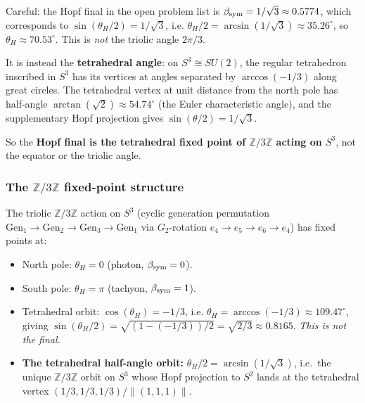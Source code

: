 \begin{remark}
\label{rem:hopf-final-fix}
Careful: the Hopf final in the open problem list is
$\beta_{\mathrm{sym}} = 1/\sqrt{3} \approx 0.5774$, which corresponds to
$\sin(\theta_H/2) = 1/\sqrt{3}$, i.e. $\theta_H/2 = \arcsin(1/\sqrt{3}) \approx 35.26^\circ$,
so $\theta_H \approx 70.53^\circ$.
This is \emph{not} the triolic angle $2\pi/3$.

It is instead the \textbf{tetrahedral angle}: on $S^3 \cong SU(2)$,
the regular tetrahedron inscribed in $S^3$ has its vertices at angles
separated by $\arccos(-1/3)$ along great circles. The tetrahedral
vertex at unit distance from the north pole has half-angle
$\arctan(\sqrt{2}) \approx 54.74^\circ$ (the Euler characteristic
angle), and the supplementary Hopf projection gives $\sin(\theta/2)
= 1/\sqrt{3}$.

So the \textbf{Hopf final is the tetrahedral fixed point of
$\mathbb{Z}/3\mathbb{Z}$ acting on $S^3$}, not the equator or the
triolic angle.
\end{remark}

\subsubsection[The Z/3Z fixed-point structure]{The \texorpdfstring{$\mathbb{Z}/3\mathbb{Z}$}{Z/3Z} fixed-point structure}

\begin{proposition}
\label{prop:z3z-orbits}
The triolic $\mathbb{Z}/3\mathbb{Z}$ action on $S^3$ (cyclic
generation permutation $\mathrm{Gen}_1 \to \mathrm{Gen}_2 \to
\mathrm{Gen}_3 \to \mathrm{Gen}_1$ via $G_2$-rotation
$e_4 \to e_5 \to e_6 \to e_4$) has fixed points at:
\begin{itemize}
\item North pole: $\theta_H = 0$ (photon, $\beta_{\mathrm{sym}} = 0$).
\item South pole: $\theta_H = \pi$ (tachyon, $\beta_{\mathrm{sym}} = 1$).
\item Tetrahedral orbit: $\cos(\theta_H) = -1/3$, i.e. $\theta_H = \arccos(-1/3) \approx 109.47^\circ$, giving $\sin(\theta_H/2) = \sqrt{(1 - (-1/3))/2} = \sqrt{2/3} \approx 0.8165$. \emph{This is not the final.}
\item \textbf{The tetrahedral half-angle orbit:} $\theta_H/2 =
 \arcsin(1/\sqrt{3})$, i.e.\ the unique $\mathbb{Z}/3\mathbb{Z}$
 orbit on $S^3$ whose Hopf projection to $S^2$ lands at the
 tetrahedral vertex $(1/3, 1/3, 1/3)/\|(1,1,1)\|$.
\end{itemize}
\end{proposition}

